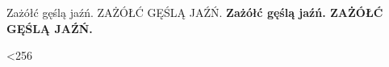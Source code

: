\documentclass[english,arimo,pagenr]{UWletterhead}
\begin{document}
\UWheader

Za\.z\'o{\l}\'c g\k{e}\'sl\k{a} ja\'z\'n.
ZA\.Z\'O{\L}\'C G\k{E}\'SL\k{A} JA\'Z\'N.
\textbf{Za\.z\'o{\l}\'c g\k{e}\'sl\k{a} ja\'z\'n.
ZA\.Z\'O{\L}\'C G\k{E}\'SL\k{A} JA\'Z\'N.}

\loop\ifnum\Slot<256
	\ifnum{} \else \char\Slot\ \textbf{\char\Slot}\ \fi
	\advance{}
\repeat


\end{document}
